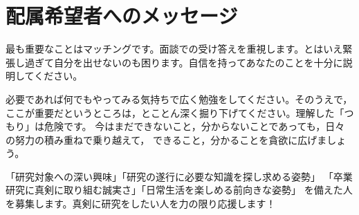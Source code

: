 \documentclass[paper=a4paper,fontsize=10.4pt]{jlreq}
\begin{document}
\section{配属希望者へのメッセージ}

最も重要なことはマッチングです。面談での受け答えを重視します。とはいえ緊張し過ぎて自分を出せないのも困ります。自信を持ってあなたのことを十分に説明してください。

必要であれば何でもやってみる気持ちで広く勉強をしてください。そのうえで，ここが重要だというところは，とことん深く掘り下げてください。理解した「つもり」は危険です。
今はまだできないこと，分からないことであっても，日々の努力の積み重ねで乗り越えて，
できること，分かることを貪欲に広げましょう。

「研究対象への深い興味」「研究の遂行に必要な知識を探し求める姿勢」
「卒業研究に真剣に取り組む誠実さ」「日常生活を楽しめる前向きな姿勢」
を備えた人を募集します。真剣に研究をしたい人を力の限り応援します！

%
%
\end{document}
